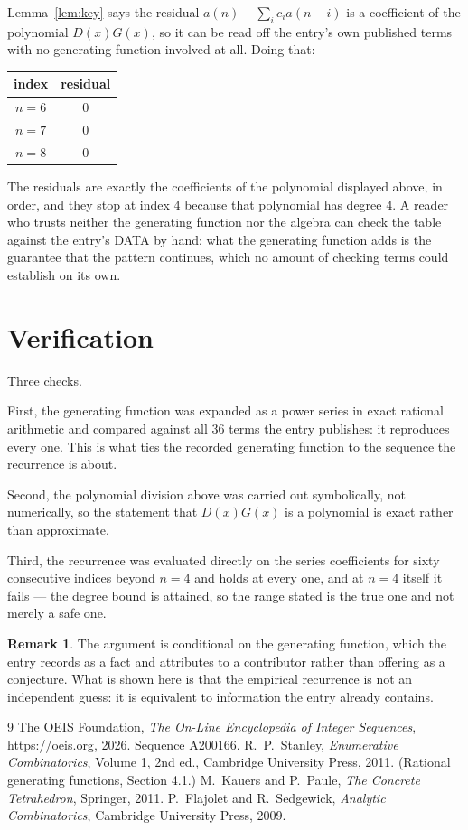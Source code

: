 \documentclass[11pt,a4paper]{article}
\theoremstyle{plain}
\theoremstyle{definition}
\newtheorem{remark}[theorem]{Remark}
\begin{document}
Lemma~\ref{lem:key} says the residual $a(n)-\sum_ic_ia(n-i)$ is a coefficient of the
polynomial $D(x)G(x)$, so it can be read off the entry's own published terms with no
generating function involved at all. Doing that:
\begin{center}
\begin{tabular}{cc}
index & residual \\ \hline
$n=6$ & $0$ \\
$n=7$ & $0$ \\
$n=8$ & $0$
\end{tabular}
\end{center}
The residuals are exactly the coefficients of the polynomial displayed above, in order, and
they stop at index $4$ because that polynomial has degree $4$. A reader who trusts
neither the generating function nor the algebra can check the table against the entry's DATA
by hand; what the generating function adds is the guarantee that the pattern continues, which
no amount of checking terms could establish on its own.

\section{Verification}

Three checks.

First, the generating function was expanded as a power series in exact rational arithmetic and
compared against all $36$ terms the entry publishes: it reproduces every one. This is
what ties the recorded generating function to the sequence the recurrence is about.

Second, the polynomial division above was carried out symbolically, not numerically, so the
statement that $D(x)G(x)$ is a polynomial is exact rather than approximate.

Third, the recurrence was evaluated directly on the series coefficients for sixty consecutive
indices beyond $n=4$ and holds at every one, and at $n=4$ itself it fails --- the
degree bound is attained, so the range stated is the true one and not merely a safe one.

\begin{remark}
The argument is conditional on the generating function, which the entry records as a fact and
attributes to a contributor rather than offering as a conjecture. What is shown here is that
the empirical recurrence is not an independent guess: it is equivalent to information the
entry already contains.
\end{remark}

\begin{thebibliography}{9}
 The OEIS Foundation, \emph{The On-Line Encyclopedia of Integer
Sequences}, \url{https://oeis.org}, 2026. Sequence A200166.
 R.~P.~Stanley, \emph{Enumerative Combinatorics}, Volume 1, 2nd ed.,
Cambridge University Press, 2011. (Rational generating functions, Section 4.1.)
 M.~Kauers and P.~Paule, \emph{The Concrete Tetrahedron}, Springer, 2011.
 P.~Flajolet and R.~Sedgewick, \emph{Analytic Combinatorics}, Cambridge
University Press, 2009.
\end{thebibliography}
\end{document}
